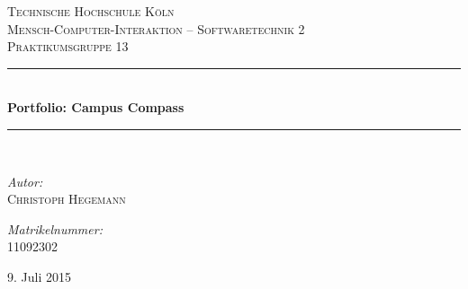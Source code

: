 \begin{titlepage}
\begin{center}

\textsc{\LARGE Technische Hochschule Köln}\\[1.5cm] %
\textsc{\Large Mensch-Computer-Interaktion -- Softwaretechnik 2}\\[0.5cm] %
\textsc{\large Praktikumsgruppe 13}\\[0.5cm] %

\newcommand{\HRule}{\rule{\linewidth}{0.5mm}}
\HRule \\[0.6cm]
{ \huge \bfseries Portfolio: Campus Compass}\\[0.4cm]
\HRule \\[1.5cm]
\begin{minipage}{0.5\textwidth}
\begin{center} \large
\emph{Autor:}\\
\textsc{Christoph Hegemann}

\emph{Matrikelnummer:}\\
\textsc{11092302}
\end{center}
\end{minipage}
\hfill

\vfill
{\large 9. Juli 2015}
\end{center}
\end{titlepage}